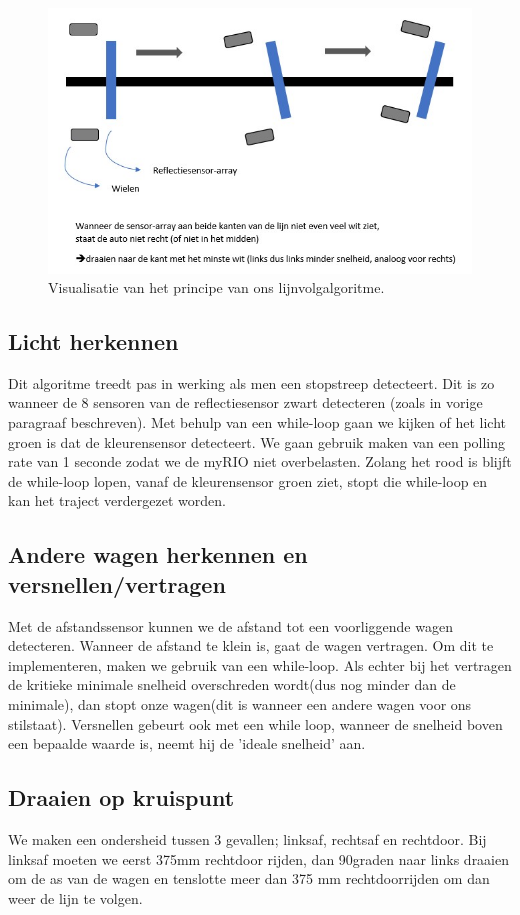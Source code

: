 \documentclass[a4paper,twoside,kulak]{kulakreport}
\begin{document}
	\begin{figure}
		\centering
		\includegraphics[width=.84\textwidth]{pref2}
		\caption{Visualisatie van het principe van ons lijnvolgalgoritme.
		}
		\label{fig: lijnvolg}
		
	\end{figure}
	\subsection{Licht herkennen}
	Dit algoritme treedt pas in werking als men een stopstreep detecteert. Dit is zo wanneer de 8 sensoren van de reflectiesensor zwart detecteren (zoals in vorige paragraaf beschreven). Met behulp van een while-loop gaan we kijken of het licht groen is dat de kleurensensor detecteert. We gaan gebruik maken van een polling rate van 1 seconde zodat we de myRIO niet overbelasten. Zolang het rood is blijft de while-loop lopen, vanaf de kleurensensor groen ziet, stopt die while-loop en kan het traject verdergezet worden.
	
	\subsection{Andere wagen herkennen en versnellen/vertragen}
	
	Met de afstandssensor kunnen we de afstand tot een voorliggende wagen detecteren. Wanneer de afstand te klein is, gaat de wagen vertragen. Om dit te implementeren,  maken we gebruik van een while-loop. Als echter bij het vertragen de kritieke minimale snelheid overschreden wordt(dus nog minder dan de minimale), dan stopt onze wagen(dit is wanneer een andere wagen voor ons stilstaat). Versnellen gebeurt ook met een while loop, wanneer de snelheid boven een bepaalde waarde is, neemt hij de 'ideale snelheid' aan.
	
	\subsection{Draaien op kruispunt}
	We maken een ondersheid tussen 3 gevallen; linksaf, rechtsaf en rechtdoor. Bij linksaf moeten we eerst 375mm rechtdoor rijden, dan 90graden naar links draaien om de as van de wagen en tenslotte meer dan 375 mm rechtdoorrijden om dan weer de lijn te volgen.
	
\end{document}
